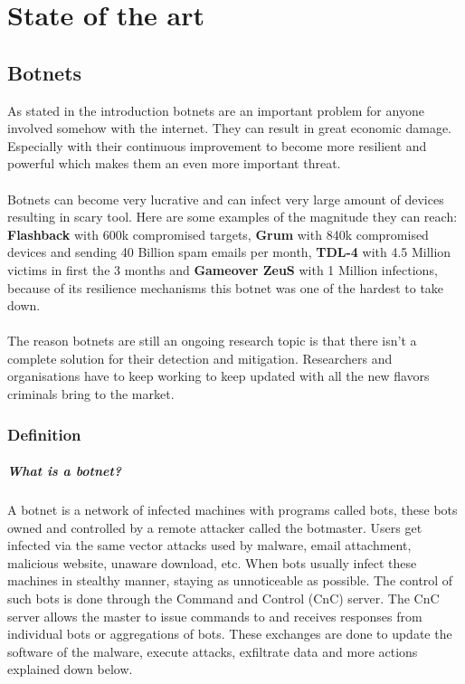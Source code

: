 
\chapter{State of the art}

\label{State of the art}

\cite{survey1}
\section{Botnets}
\cite{survey2}
As stated in the introduction botnets are an important problem for anyone involved somehow with the internet. They can result in great economic damage.
\cite{report1} 
Especially with their continuous improvement to become more resilient and powerful which makes them an even more important threat.\\\\
\cite{pheonix} 
Botnets can become very lucrative and can infect very large amount of devices resulting in scary tool. Here are some examples of the magnitude they can reach: \textbf{Flashback} with 600k compromised targets, \textbf{Grum} with 840k compromised devices and sending 40 Billion spam emails per month, \textbf{TDL-4} with 4.5 Million victims in first the 3 months and \textbf{Gameover ZeuS} with 1 Million infections, because of its resilience mechanisms this botnet was one of the hardest to take down.\\\\
\cite{survey2}
The reason botnets are still an ongoing research topic is that there isn't a complete solution for their detection and mitigation. Researchers and organisations have to keep working to keep updated with all the new flavors criminals bring to the market.
\subsection{Definition}
\cite{memoire1}
\cite{detection1}
\paragraph{What is a botnet?} A botnet is a network of infected machines with programs called bots, these bots owned and controlled by a remote attacker called the botmaster. Users get infected via the same vector attacks used by malware, email attachment, malicious website, unaware download, etc. When bots usually infect these machines in stealthy manner, staying as unnoticeable as possible. The control of such bots is done through the Command and Control (CnC) server. The CnC server allows the master to issue commands to and receives responses from individual bots or aggregations of bots. These exchanges are done to update the software of the malware, execute attacks, exfiltrate data and more actions explained down below.
\cite{survey3}

